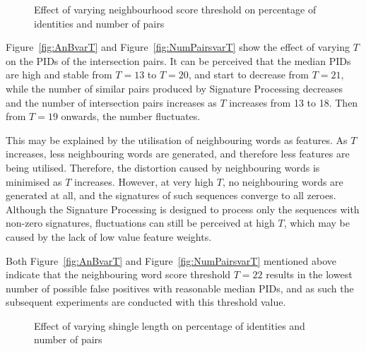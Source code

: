 \documentclass[titlepage]{csetr}
\begin{document}
\begin{figure}[t]
\centering
{}
\caption{Effect of varying neighbourhood score threshold on percentage of identities and number of pairs}
\label{fig:exp-quality-varT}
\end{figure}

Figure~\ref{fig:AnBvarT} and Figure~\ref{fig:NumPairsvarT} show the effect of varying $T$ on the PIDs of the intersection pairs. It can be perceived that the median PIDs are high and stable from $T=13$ to $T=20$, and start to decrease from $T=21$, while the number of similar pairs produced by Signature Processing decreases and the number of intersection pairs increases as $T$ increases from 13 to 18. Then from $T=19$ onwards, the number fluctuates.

This may be explained by the utilisation of neighbouring words as features. As $T$ increases, less neighbouring words are generated, and therefore less features are being utilised. Therefore, the distortion caused by neighbouring words is minimised as $T$ increases. However, at very high $T$, no neighbouring words are generated at all, and the signatures of such sequences converge to all zeroes. Although the Signature Processing is designed to process only the sequences with non-zero signatures, fluctuations can still be perceived at high $T$, which may be caused by the lack of low value feature weights.

Both Figure~\ref{fig:AnBvarT} and Figure~\ref{fig:NumPairsvarT} mentioned above indicate that the neighbouring word score threshold $T=22$ results in the lowest number of possible false positives with reasonable median PIDs, and as such the subsequent experiments are conducted with this threshold value.

\begin{figure}[t]
\centering
{}
\caption{Effect of varying shingle length on percentage of identities and number of pairs}
\label{fig:exp-quality-varK}
\end{figure}
\end{document}
